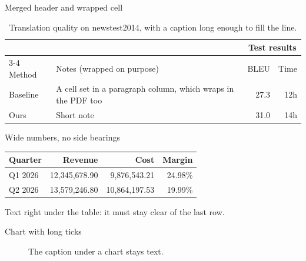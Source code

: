 \documentclass{beamer}
\begin{document}
\begin{frame}[label=table-merged]{Merged header and wrapped cell}
  \begin{table}
    \centering\small
    \begin{tabular}{lp{3.2cm}rr}
      \toprule
      & & \multicolumn{2}{c}{Test results} \\
      \cmidrule(l){3-4}
      Method & Notes (wrapped on purpose) & BLEU & Time \\
      \midrule
      Baseline & A cell set in a paragraph column, which wraps in the PDF too & 27.3 & 12h \\
      Ours & Short note & 31.0 & 14h \\
      \bottomrule
    \end{tabular}
    \caption{Translation quality on newstest2014, with a caption long enough to fill the line.}
  \end{table}
\end{frame}

\begin{frame}[label=table-wide]{Wide numbers, no side bearings}
  \centering
  \begin{tabular}{@{}lrrr@{}}
    \hline
    Quarter & Revenue & Cost & Margin \\
    \hline
    Q1 2026 & 12,345,678.90 & 9,876,543.21 & 24.98\% \\
    Q2 2026 & 13,579,246.80 & 10,864,197.53 & 19.99\% \\
    \hline
  \end{tabular}

  \vspace{4pt}
  Text right under the table: it must stay clear of the last row.
\end{frame}

\begin{frame}[label=chart]{Chart with long ticks}
  \begin{figure}
    \caption{The caption under a chart stays text.}
  \end{figure}
\end{frame}
\end{document}
